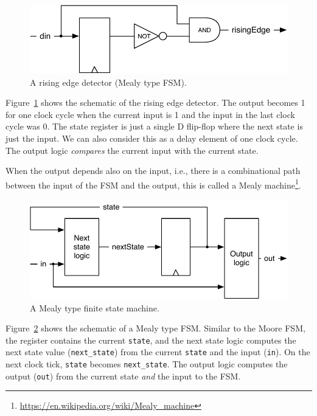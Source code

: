 \documentclass[%
    10pt,
    headinclude, footexclude,
    openright, %
    notitlepage,
    cleardoubleempty,
    headsepline,
    pointlessnumbers,
    bibtotoc, idxtotoc,
    ]{scrbook}
\newcommand{\code}[1]{{\small{\texttt{#1}}}}
\newcommand{\scale}{0.7}
\newcommand{\myref}[2]{\href{#1}{#2}}
\renewcommand{\myref}[2]{{#2}{\footnote{\url{#1}}}}
\begin{document}

\begin{figure}
  \centering
  \includegraphics[scale=\scale]{figures/fsm-rising}
  \caption{A rising edge detector (Mealy type FSM).}
  \label{fig:fsm-rising}
\end{figure}

Figure~\ref{fig:fsm-rising} shows the schematic of the rising edge detector.
The output becomes 1 for one clock cycle when the current input is 1
and the input in the last clock cycle was 0.
The state register is just a single D flip-flop where the next state
is just the input. We can also consider this as a delay element of one
clock cycle. The output logic \emph{compares} the current
input with the current state.



When the output depends also on the input, i.e., there is a combinational path between
the input of the FSM and the output, this is called a
\myref{https://en.wikipedia.org/wiki/Mealy_machine}{Mealy machine}.

\begin{figure}
  \centering
  \includegraphics[scale=\scale]{figures/mealy}
  \caption{A Mealy type finite state machine.}
  \label{fig:mealy}
\end{figure}

Figure~\ref{fig:mealy} shows the schematic of a Mealy type FSM.
Similar to the Moore FSM, the register contains the current \code{state}, and
the next state logic computes the next state value (\code{next\_state})
from the current \code{state} and the input (\code{in}).
On the next clock tick, \code{state} becomes \code{next\_state}.
The output logic computes the output (\code{out}) from the current state
\emph{and} the input to the FSM.
\end{document}

